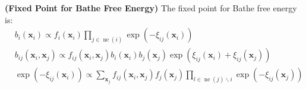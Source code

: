 \begin{proposition}{\textbf{(Fixed Point for Bathe Free Energy)}}
    The fixed point for Bathe free energy is:
    \begin{equation*}
    \begin{aligned}
        &b_i(\boldsymbol x_i) \propto f_i(\boldsymbol x_i)\prod_{j\in\operatorname{ne}(i)}\exp(-\xi_{ij}(\boldsymbol x_i)) \\
        &b_{ij}(\boldsymbol x_i, \boldsymbol x_j) \propto f_{ij}(\boldsymbol x_i, \boldsymbol x_j)b_i(\boldsymbol x_i)b_j(\boldsymbol x_j)\exp(\xi_{ij}(\boldsymbol x_i) + \xi_{ij}(\boldsymbol x_j)) \\
        &\exp(-\xi_{ij}(\boldsymbol x_i)) \propto \sum_{\boldsymbol x_j}f_{ij}(\boldsymbol x_i, \boldsymbol x_j)f_j(\boldsymbol x_j)\prod_{l\in\operatorname{ne}(j)\backslash i}\exp(-\xi_{ij}(\boldsymbol x_j)) \\
    \end{aligned}
    \end{equation*}
\end{proposition}
